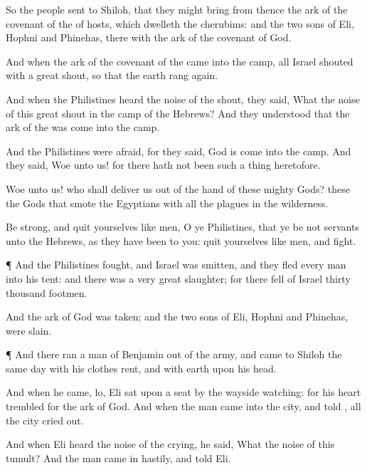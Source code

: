 {So the
people
sent to
Shiloh, that they might
bring from thence the
ark of the
covenant of the
{} of
hosts, which
dwelleth
{} the
cherubims: and the
two
sons of
Eli,
Hophni and
Phinehas,
{} there with the
ark of the
covenant of
God.

And when the
ark of the
covenant of the
{}
came into the
camp, all
Israel
shouted with a
great
shout, so that the
earth rang
again.

And when the
Philistines
heard the
noise of the
shout, they
said, What
{} the
noise of this
great
shout in the
camp of the
Hebrews? And they
understood that the
ark of the
{} was
come into the
camp.

And the
Philistines were
afraid, for they
said,
God is
come into the
camp. And they
said,
Woe unto us! for there hath not been such a thing
heretofore.

Woe unto us! who shall
deliver us out of the
hand of these
mighty
Gods? these
{} the
Gods that
smote the
Egyptians with all the
plagues in the
wilderness.

Be
strong, and
quit yourselves like
men, O ye
Philistines, that ye be not
servants unto the
Hebrews, as they have
been to you:
quit yourselves like
men, and
fight.


\par }{\PP {}¶ And the
Philistines
fought, and
Israel was
smitten, and they
fled every
man into his
tent: and there was a
very
great
slaughter; for there
fell of
Israel
thirty
thousand
footmen.

And the
ark of
God was
taken; and the
two
sons of
Eli,
Hophni and
Phinehas, were
slain.


\par }{\PP {}¶ And there
ran a
man of
Benjamin out of the
army, and
came to
Shiloh the same
day with his
clothes
rent, and with
earth upon his
head.

And when he
came, lo,
Eli
sat upon a
seat by the
wayside
watching: for his
heart
trembled for the
ark of
God. And when the
man
came into the
city, and
told
{}, all the
city cried
out.

And when
Eli
heard the
noise of the
crying, he
said, What
{} the
noise of this
tumult? And the
man
came in
hastily, and
told
Eli.

}
